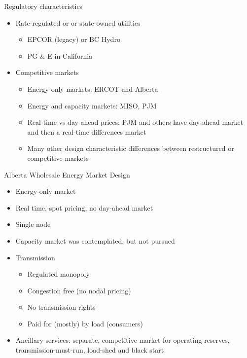 \documentclass[aspectratio=169]{beamer}
\renewcommand{\(}{\begin{columns}}
\renewcommand{\)}{\end{columns}}
\newcommand{\<}[1]{\begin{column}{#1}}
\renewcommand{\>}{\end{column}}
\begin{document}
\begin{frame}{Regulatory characteristics}
\begin{itemize}
\setlength\itemsep{1.25em}
\item Rate-regulated or or state-owned utilities
\begin{itemize}
\setlength\itemsep{.15em}
\item EPCOR (legacy) or BC Hydro
\item PG \& E in California
\end{itemize}

\item Competitive markets
\begin{itemize}
\setlength\itemsep{.15em}
\item Energy only markets: ERCOT and Alberta
\item Energy and capacity markets: MISO, PJM
\item Real-time vs day-ahead prices: PJM and others have day-ahead market and then a real-time differences market
\item Many other design characteristic differences between restructured or competitive markets
\end{itemize}
\end{itemize}
\vfill
\end{frame}


\begin{frame}{Alberta Wholesale Energy Market Design}
\begin{itemize}
\setlength\itemsep{.25em}
\item Energy-only market
\item Real time, spot pricing, no day-ahead market
\item Single node
\item Capacity market was contemplated, but not pursued
\item Transmission
\begin{itemize}
\setlength\itemsep{.25em}
\item Regulated monopoly
\item Congestion free (no nodal pricing)
\item No transmission rights
\item Paid for (mostly) by load (consumers)
\end{itemize}
\item Ancillary services: separate, competitive market for operating reserves, transmission-must-run, load-shed and black start
\end{itemize}

\vfill
\end{frame}
\end{document}
